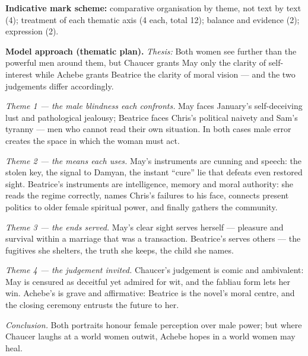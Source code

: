 \documentclass[11pt]{article}
\begin{document}
\begin{corrige}
\textbf{Indicative mark scheme:} comparative organisation by theme, not text by text (4); treatment of each thematic axis (4 each, total 12); balance and evidence (2); expression (2).

\textbf{Model approach (thematic plan).}
\emph{Thesis:} Both women see further than the powerful men around them, but Chaucer grants May only the clarity of self-interest while Achebe grants Beatrice the clarity of moral vision --- and the two judgements differ accordingly.

\emph{Theme 1 --- the male blindness each confronts.} May faces January's self-deceiving lust and pathological jealousy; Beatrice faces Chris's political naivety and Sam's tyranny --- men who cannot read their own situation. In both cases male error creates the space in which the woman must act.

\emph{Theme 2 --- the means each uses.} May's instruments are cunning and speech: the stolen key, the signal to Damyan, the instant ``cure'' lie that defeats even restored sight. Beatrice's instruments are intelligence, memory and moral authority: she reads the regime correctly, names Chris's failures to his face, connects present politics to older female spiritual power, and finally gathers the community.

\emph{Theme 3 --- the ends served.} May's clear sight serves herself --- pleasure and survival within a marriage that was a transaction. Beatrice's serves others --- the fugitives she shelters, the truth she keeps, the child she names.

\emph{Theme 4 --- the judgement invited.} Chaucer's judgement is comic and ambivalent: May is censured as deceitful yet admired for wit, and the fabliau form lets her win. Achebe's is grave and affirmative: Beatrice is the novel's moral centre, and the closing ceremony entrusts the future to her.

\emph{Conclusion.} Both portraits honour female perception over male power; but where Chaucer laughs at a world women outwit, Achebe hopes in a world women may heal.
\end{corrige}
\end{document}
